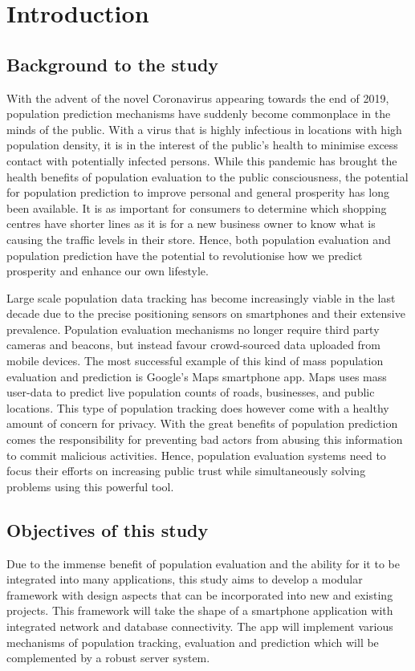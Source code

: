 \chapter{Introduction}

\section{Background to the study}
With the advent of the novel Coronavirus appearing towards the end of 2019, population prediction mechanisms have suddenly become commonplace in the minds of the public. With a virus that is highly infectious in locations with high population density, it is in the interest of the public’s health to minimise excess contact with potentially infected persons. While this pandemic has brought the health benefits of population evaluation to the public consciousness, the potential for population prediction to improve personal and general prosperity has long been available. It is as important for consumers to determine which shopping centres have shorter lines as it is for a new business owner to know what is causing the traffic levels in their store. Hence, both population evaluation and population prediction have the potential to revolutionise how we predict prosperity and enhance our own lifestyle. 

Large scale population data tracking has become increasingly viable in the last decade due to the precise positioning sensors on smartphones and their extensive prevalence. Population evaluation mechanisms no longer require third party cameras and beacons, but instead favour crowd-sourced data uploaded from mobile devices. The most successful example of this kind of mass population evaluation and prediction is Google’s Maps smartphone app. Maps uses mass user-data to predict live population counts of roads, businesses, and public locations. This type of population tracking does however come with a healthy amount of concern for privacy. With the great benefits of population prediction comes the responsibility for preventing bad actors from abusing this information to commit malicious activities. Hence, population evaluation systems need to focus their efforts on increasing public trust while simultaneously solving problems using this powerful tool.

\section{Objectives of this study}
Due to the immense benefit of population evaluation and the ability for it to be integrated into many applications, this study aims to develop a modular framework with design aspects that can be incorporated into new and existing projects. This framework will take the shape of a smartphone application with integrated network and database connectivity. The app will implement various mechanisms of population tracking, evaluation and prediction which will be complemented by a robust server system. 

